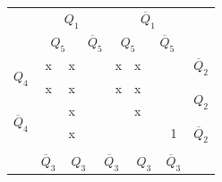 \documentclass[a4paper,14pt]{article}
\begin{document}
\begin{table}[H]
	\begin{minipage}{.5\linewidth}
		\centering
\begin{tabular}{cccccccccc}
	& \multicolumn{4}{c}{$Q_1$}                                                                       & \multicolumn{4}{c}{$\overline{Q}_1$}                                                             &                        \\
	& \multicolumn{2}{c}{$Q_5$}                       & \multicolumn{2}{c}{$\overline{Q}_5$}          & \multicolumn{2}{c}{$Q_5$}                       & \multicolumn{2}{c}{$\overline{Q}_5$}           &                        \\ \cline{2-9}
	\multicolumn{1}{c|}{\multirow{2}{*}{$Q_4$}}            & \multicolumn{1}{c|}{x} & \multicolumn{1}{c|}{x} & \multicolumn{1}{c|}{} & \multicolumn{1}{c|}{} & \multicolumn{1}{c|}{x} & \multicolumn{1}{c|}{x} & \multicolumn{1}{c|}{} & \multicolumn{1}{c|}{}  & $\overline{Q}_2$       \\ \cline{2-9}
	\multicolumn{1}{c|}{}                                  & \multicolumn{1}{c|}{x} & \multicolumn{1}{c|}{x} & \multicolumn{1}{c|}{} & \multicolumn{1}{c|}{} & \multicolumn{1}{c|}{x} & \multicolumn{1}{c|}{x} & \multicolumn{1}{c|}{} & \multicolumn{1}{c|}{}  & \multirow{2}{*}{$Q_2$} \\ \cline{2-9}
	\multicolumn{1}{c|}{\multirow{2}{*}{$\overline{Q}_4$}} & \multicolumn{1}{c|}{}  & \multicolumn{1}{c|}{x} & \multicolumn{1}{c|}{} & \multicolumn{1}{c|}{} & \multicolumn{1}{c|}{}  & \multicolumn{1}{c|}{x} & \multicolumn{1}{c|}{} & \multicolumn{1}{c|}{}  &                        \\ \cline{2-9}
	\multicolumn{1}{c|}{}                                  & \multicolumn{1}{c|}{}  & \multicolumn{1}{c|}{x} & \multicolumn{1}{c|}{} & \multicolumn{1}{c|}{} & \multicolumn{1}{c|}{}  & \multicolumn{1}{c|}{}  & \multicolumn{1}{c|}{} & \multicolumn{1}{c|}{1} & $\overline{Q}_2$       \\ \cline{2-9}
	&                        & \multicolumn{2}{c}{}                           & \multicolumn{2}{c}{}                           & \multicolumn{2}{c}{}                           &                        &                        \\
	& $\overline{Q}_3$       & \multicolumn{2}{c}{$Q_3$}                      & \multicolumn{2}{c}{$\overline{Q}_3$}           & \multicolumn{2}{c}{$Q_3$}                      & $\overline{Q}_3$       &                       

\end{tabular}
\end{minipage}
\end{table}
\end{document}
